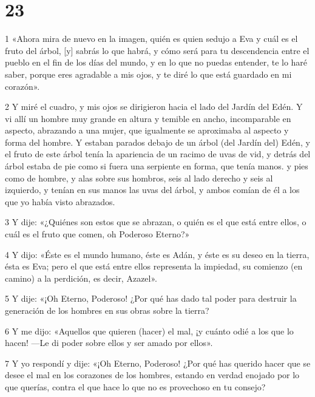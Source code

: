 \chapter{23}

\par 1 «Ahora mira de nuevo en la imagen, quién es quien sedujo a Eva y cuál es el fruto del árbol, [y] sabrás lo que habrá, y cómo será para tu descendencia entre el pueblo en el fin de los días del mundo, y en lo que no puedas entender, te lo haré saber, porque eres agradable a mis ojos, y te diré lo que está guardado en mi corazón».

\par 2 Y miré el cuadro, y mis ojos se dirigieron hacia el lado del Jardín del Edén. Y vi allí un hombre muy grande en altura y temible en ancho, incomparable en aspecto, abrazando a una mujer, que igualmente se aproximaba al aspecto y forma del hombre. Y estaban parados debajo de un árbol (del Jardín del) Edén, y el fruto de este árbol tenía la apariencia de un racimo de uvas de vid, y detrás del árbol estaba de pie como si fuera una serpiente en forma, que tenía manos. y pies como de hombre, y alas sobre sus hombros, seis al lado derecho y seis al izquierdo, y tenían en sus manos las uvas del árbol, y ambos comían de él a los que yo había visto abrazados.

\par 3 Y dije: «¿Quiénes son estos que se abrazan, o quién es el que está entre ellos, o cuál es el fruto que comen, oh Poderoso Eterno?»

\par 4 Y dijo: «Éste es el mundo humano, éste es Adán, y éste es su deseo en la tierra, ésta es Eva; pero el que está entre ellos representa la impiedad, su comienzo (en camino) a la perdición, es decir, Azazel».

\par 5 Y dije: «¡Oh Eterno, Poderoso! ¿Por qué has dado tal poder para destruir la generación de los hombres en sus obras sobre la tierra?

\par 6 Y me dijo: «Aquellos que quieren (hacer) el mal, ¡y cuánto odié a los que lo hacen! —Le di poder sobre ellos y ser amado por ellos».

\par 7 Y yo respondí y dije: «¡Oh Eterno, Poderoso! ¿Por qué has querido hacer que se desee el mal en los corazones de los hombres, estando en verdad enojado por lo que querías, contra el que hace lo que no es provechoso en tu consejo?

